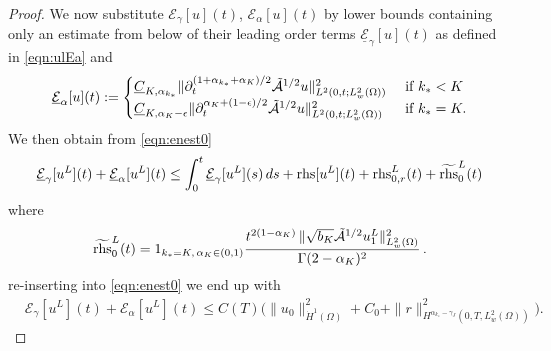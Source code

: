 \begin{proof}
We now substitute $\mathcal{E}_\gamma[u](t)$, $\mathcal{E}_\alpha[u](t)$ by lower bounds containing only an estimate from below of their leading order terms  $\underline{\mathcal{E}}_\gamma[u](t)$ as defined in \eqref{eqn:ulEa} and 
\begin{equation}\label{eqn:ulEb}
\underline{\mathcal{E}}_\alpha[u](t) :=
\begin{cases}
{\underline{C}_{K,\alpha_{k_*}}} \| \partial_t^{(1+\alpha_{k_*}+\alpha_K)/2}\tilde{\mathcal{A}}^{1/2}u \|_{L^2(0,t;L^2_w(\Omega))}^2
&\mbox{ if }k_*<K\\
{\underline{C}_{K,\alpha_K-\epsilon} \| \partial_t^{\alpha_K+(1-\epsilon)/2}\tilde{\mathcal{A}}^{1/2}u \|_{L^2(0,t;L^2_w(\Omega))}^2}
&\mbox{ if }k_*=K.
\end{cases}
\end{equation}
We then obtain from \eqref{eqn:enest0}
\begin{equation}\label{eqn:enest1}
\underline{\mathcal{E}}_\gamma[u^L](t)+\underline{\mathcal{E}}_\alpha[u^L](t)\leq 
{\int_0^t \underline{\mathcal{E}}_\gamma[u^L](s)\, ds} 
+\mbox{rhs}[u^L](t) + \mbox{rhs}_{0,r}^L(t)
+ \widetilde{\mbox{rhs}}_0^L(t)
\end{equation}
where 
\[
\widetilde{\mbox{rhs}}_0^L(t)=
1_{k_*=K,\,\alpha_K\in(0,1)}\frac{t^{2(1-\alpha_{K})}\,\|\sqrt{b_{K}}\tilde{\mathcal{A}}^{1/2}u_1^L\|_{L^2_w(\Omega)}^2}{\Gamma(2-\alpha_{K})^2}\,.
\]
re-inserting into \eqref{eqn:enest0} we end up with 
\begin{equation}\label{eqn:enest_sumfrac_L}
\begin{aligned}
&\mathcal{E}_\gamma[u^L](t)+\mathcal{E}_\alpha[u^L](t)
\leq C(T) \bigl(\|u_0\|_{\dot{H}^1(\Omega)}^2 + C_0 +\|r\|_{H^{\alpha_{k_*}-\gamma_J}(0,T,L^2_w(\Omega))}^2\bigr).
\end{aligned}
\end{equation}



\end{proof}
